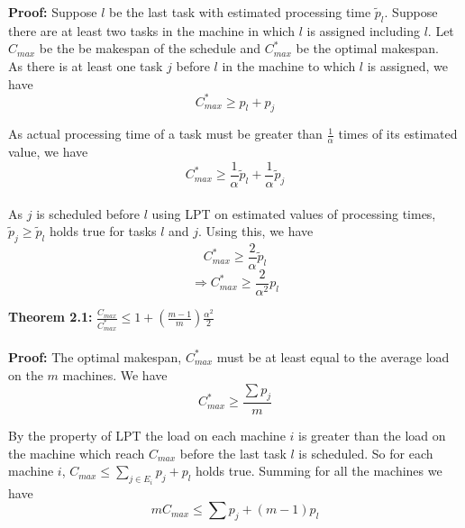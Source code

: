 \documentclass[10pt, conference, compsocconf]{IEEEtran}
\begin{document}
\textbf{Proof:} Suppose $l$ be the last task with estimated processing time $\tilde p_l$. Suppose
there are at least two tasks in the machine in which $l$ is assigned including $l$. Let
$C_{max}$ be the be makespan of the schedule and $C_{max}^{*}$ be the optimal makespan.\\

As there is at least one task $j$ before $l$ in the machine to which $l$ is
assigned, we have
\begin{equation}\nonumber
C_{max}^{*}\geq p_l + p_j
\end{equation}



As actual processing time of a task must be greater than $\frac{1}{\alpha}$ times of its estimated value, we have
\begin{equation}\nonumber 
C_{max}^{*} \geq \frac{1}{\alpha}\tilde p_l +  \frac{1}{\alpha} \tilde p_j 
\end{equation}
\\
As $j$ is scheduled before $l$ using LPT on estimated values of processing times,  $\tilde p_j\geq   \tilde p_l$ holds true for tasks $l$ and $j$.  Using this, we have\\

\begin{equation}\nonumber
 C_{max}^{*} \geq \frac{2}{\alpha}\tilde p_l
 \end{equation}
\begin{equation}
\Rightarrow C_{max}^{*} \geq {\frac{2}{\alpha^{2}}} p_l  \end{equation}


\textbf{Theorem 2.1:} $\frac{C_{max}}{C_{max}^{*}} \leq 1 + (\frac{m-1}{m})\frac{\alpha^{2}}{2}$\\
\\
\textbf{Proof:} The optimal makespan, $C_{max}^{*}$ must be at least equal to the average load on the $m$ machines. We have\\
\begin{equation}
C_{max}^{*}\geq\frac{\sum p_j}{m}
\end{equation}

By the property of LPT the load on each machine $i$ is greater than the load on the machine which reach $C_{max}$ before the last task $l$ is scheduled. So for each machine $i$, $C_{max} \leq  \sum_{j \in E_i}^{}{p_j} + p_l$ holds true.  Summing for all the machines we have\\

\begin{equation}\nonumber 
mC_{max} \leq  \sum {p_j} + (m-1)p_l
\end{equation}
\end{document}
